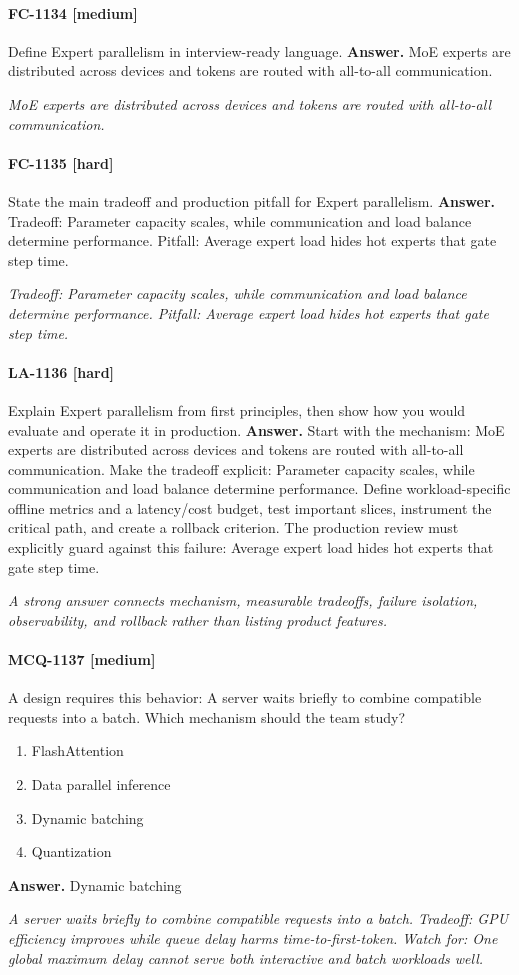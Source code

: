 \paragraph{FC-1134 [medium]} Define Expert parallelism in interview-ready language.
\noindent\textbf{Answer.} MoE experts are distributed across devices and tokens are routed with all-to-all communication.
\par\textit{MoE experts are distributed across devices and tokens are routed with all-to-all communication.}
\paragraph{FC-1135 [hard]} State the main tradeoff and production pitfall for Expert parallelism.
\noindent\textbf{Answer.} Tradeoff: Parameter capacity scales, while communication and load balance determine performance. Pitfall: Average expert load hides hot experts that gate step time.
\par\textit{Tradeoff: Parameter capacity scales, while communication and load balance determine performance. Pitfall: Average expert load hides hot experts that gate step time.}
\paragraph{LA-1136 [hard]} Explain Expert parallelism from first principles, then show how you would evaluate and operate it in production.
\noindent\textbf{Answer.} Start with the mechanism: MoE experts are distributed across devices and tokens are routed with all-to-all communication. Make the tradeoff explicit: Parameter capacity scales, while communication and load balance determine performance. Define workload-specific offline metrics and a latency/cost budget, test important slices, instrument the critical path, and create a rollback criterion. The production review must explicitly guard against this failure: Average expert load hides hot experts that gate step time.
\par\textit{A strong answer connects mechanism, measurable tradeoffs, failure isolation, observability, and rollback rather than listing product features.}
\paragraph{MCQ-1137 [medium]} A design requires this behavior: A server waits briefly to combine compatible requests into a batch. Which mechanism should the team study?
\begin{enumerate}[label=\Alph*.]
\item FlashAttention
\item Data parallel inference
\item Dynamic batching
\item Quantization
\end{enumerate}
\noindent\textbf{Answer.} Dynamic batching
\par\textit{A server waits briefly to combine compatible requests into a batch. Tradeoff: GPU efficiency improves while queue delay harms time-to-first-token. Watch for: One global maximum delay cannot serve both interactive and batch workloads well.}
